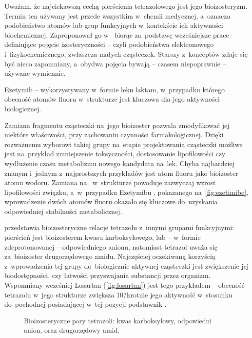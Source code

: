 Uważam, że najciekawszą cechą pierścienia tetrazolowego jest jego bioizosteryzm.
Termin ten używany jest przede wszystkim w~chemii medycznej, a~oznacza podobieństwo atomów
  lub grup funkcyjnych w~kontekście ich aktywności biochemicznej.
Zaproponował go \citeauthor{friedman50} w~\citeyear{friedman50}
  biorąc za~podstawę wcześniejsze prace definiujące pojęcie izosteryczności \---
  czyli podobieństwa elektronowego i~fizykochemicznego, zwłaszcza małych cząsteczek.
Starszy z~konceptów zdaje się być nieco zapomniany, a~obydwa pojęcia bywają \---
  czasem niepoprawnie \--- używane wymiennie.

\begin{marginfigure}
  
  \caption{
    Ezetymib \--- wykorzystywany w~formie leku laktam, w~przypadku którego obecność atomów fluoru
      w~strukturze jest kluczowa dla jego aktywności biologicznej.
  }
  \label{fig:ezetimibe}
\end{marginfigure}
Zamiana fragmentu cząsteczki na~jego bioizoster pozwala zmodyfikować jej niektóre właściwości,
  przy zachowaniu czynności farmakologicznej.
Dzięki rozważnemu wyborowi takiej grupy na~etapie projektowania cząsteczki możliwe jest na~przykład
  zmniejszenie toksyczności, dostosowanie lipofilowości czy wydłużenie czasu metabolizmu
  nowego kandydata na~lek.
Chyba najbardziej znanym i~jednym z~najprostszych przykładów jest atom fluoru jako
  bioizoster atomu wodoru.
Zamiana  na~ w~strukturze powoduje zazwyczaj wzrost lipofilowości
  związku, a~w~przypadku Ezetymibu ,
  pokazanego na~\cref{fig:ezetimibe}, wprowadzenie dwóch atomów fluoru
  okazało się kluczowe do~uzyskania odpowiedniej stabilności metabolicznej.

 przedstawia bioizosteryczne relacje tetrazolu z~innymi grupami funkcyjnymi:
  pierścień  jest bioizosterem kwasu karboksylowego, lub \---
  w~formie zdeprotonowanej \--- odpowiedniego anionu, natomiast  tetrazol
  uważa się za~bioizoster drugorzędowego amidu.
Najczęściej oczekiwaną korzyścią z~wprowadzenia tej grupy do~biologicznie aktywnej cząsteczki
  jest zwiększenie jej biodostępności, czy łatwości przyswajania substancji przez organizm.
Wspomniany wcześniej Losartan (\cref{fig:losartan}) jest tego przykładem \---
  obecność tetrazolu w~jego strukturze zwiększa 10\=/krotnie jego aktywność w~stosunku
  do~pochodnej posiadającej w~tej pozycji podstawnik .
\begin{figure}
  
  \caption{
    Bioizosteryczne pary tetrazoli: kwas karboksylowy, odpowiedni anion, oraz drugorzędowy amid.
  }
  \label{fig:bioisosteres}
\end{figure}

